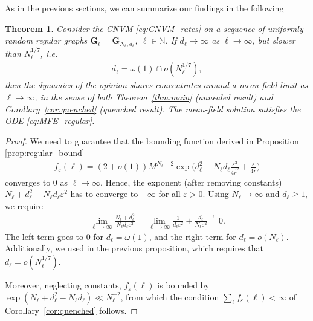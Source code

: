 \documentclass[a4paper,
               10pt,
               pdftex,
               normalheadings,
               headsepline,
               footsepline,
               headinclude,
               footinclude,
               DIV=14,
               abstracton]
{scrartcl}
\newtheorem{theorem}{Theorem}[section]
\newcommand{\rv}[1]{\bm{#1}}
\newcommand{\review}[1]{{#1}}
\begin{document}
As in the previous sections, we can summarize our findings in the following
\begin{theorem} \label{thm:regular}
Consider the CNVM \eqref{eq:CNVM_rates} on a sequence of uniformly random regular graphs $\rv{G}_\ell = \rv{G}_{N_\ell, d_\ell}$, $\ell \in \mathbb{N}$.
If $d_\ell \to \infty$ as $\ell \to \infty$, but slower than $N_\ell^{1/7}$, i.e.
\begin{align}
    d_\ell = \omega(1) \cap o(N_\ell^{1/7}),
\end{align}
then the dynamics of the opinion shares concentrates around a mean-field limit as $\ell \to \infty$, \review{in the sense of both Theorem~\ref{thm:main} (annealed result) and Corollary~\ref{cor:quenched} (quenched result)}. The mean-field solution satisfies the ODE \eqref{eq:MFE_regular}.
\end{theorem}
\begin{proof}
We need to guarantee that the bounding function derived in Proposition \ref{prop:regular_bound}
\begin{align}
    f_\varepsilon(\ell) = (2+o(1)) M^{N_\ell+2} \exp\Big(d_\ell^2 - N_\ell d_\ell \frac{\varepsilon^2}{4 \hat{r}^2} + \frac{\varepsilon}{4 \hat{r}}\Big)
\end{align}
converges to $0$ as $\ell \to \infty$. Hence, the exponent (after removing constants) $N_\ell + d_\ell^2 - N_\ell d_\ell \varepsilon^2$ has to converge to $-\infty$ for all $\varepsilon > 0$. Using $N_\ell \to \infty$ and $d_\ell \geq 1$, we require
\begin{align}
    \lim_{\ell \to \infty} \frac{N_\ell + d_\ell^2}{N_\ell d_\ell \varepsilon^2} = \lim_{\ell \to \infty} \frac{1}{d_\ell \varepsilon^2} + \frac{d_\ell}{N_\ell \varepsilon^2} \overset{!}{=} 0.
\end{align}
The left term goes to $0$ for $d_\ell = \omega(1)$, and the right term for $d_\ell = o(N_\ell)$. Additionally, we used \cite[Thm 11.3]{Frieze2015} in the previous proposition, which requires that  $d_\ell = o(N_\ell^{1/7})$.

\review{Moreover, neglecting constants, $f_\varepsilon(\ell)$ is bounded by $\exp(N_\ell + d_\ell^2 - N_\ell d_\ell) \ll N_\ell^{-2}$, from which the condition $\sum_\ell f_\varepsilon(\ell) < \infty$ of Corollary~\ref{cor:quenched} follows.}
\end{proof}
\end{document}
